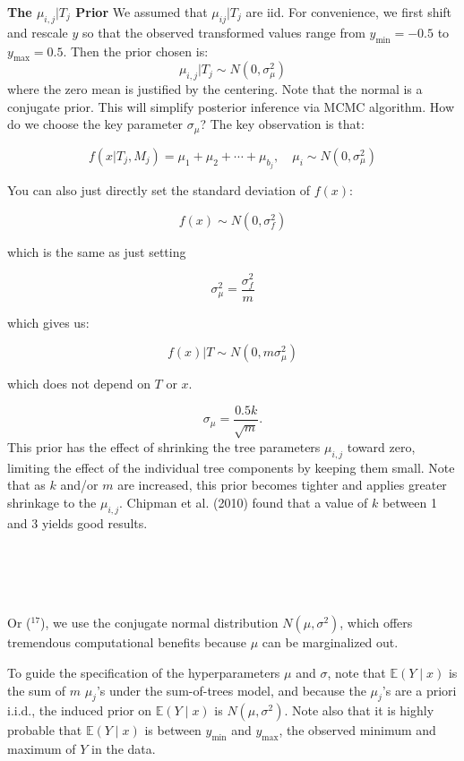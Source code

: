 \documentclass[a4paper,11pt]{article}
\begin{document}
\textbf{The \( \mu_{i,j} | T_j \) Prior}
We assumed that $\mu_{ij} | T_j$ are iid. For convenience, we first shift and rescale \( y \) so that the observed transformed values range from \( y_{\text{min}} = -0.5 \) to \( y_{\text{max}} = 0.5 \). Then the  prior chosen is:
\[
\mu_{i,j}| T_j \sim N(0, \sigma_\mu^2)
\]
where the zero mean is justified by the centering.  Note that the normal is a conjugate prior. This will simplify posterior inference via MCMC algorithm.
How do we choose the key parameter \( \sigma_\mu \)?
The key observation is that:

\[
f(x | T_j, M_j) = \mu_1 + \mu_2 + \cdots + \mu_{b_j}, \quad \mu_i \sim N(0, \sigma_\mu^2)
\]

You can also just directly set the standard deviation of \( f(x) \):

\[
f(x) \sim N(0, \sigma_f^2)
\]

which is the same as just setting

\[
\sigma_\mu^2 = \frac{\sigma_f^2}{m}
\]

which gives us:

\[
f(x) | T \sim N(0, m\sigma_\mu^2)
\]

which does not depend on \( T \) or \( x \).

\[
\sigma_\mu = \frac{0.5 k}{\sqrt{m}}.
\]
This prior has the effect of shrinking the tree parameters \( \mu_{i,j} \) toward zero, limiting the effect of the individual tree components by keeping them small. Note that as \( k \) and/or \( m \) are increased, this prior becomes tighter and applies greater shrinkage to the \( \mu_{i,j} \). Chipman et al. (2010) found that a value of \( k \) between 1 and 3 yields good results.

\\\\\\\\Or (\(^ {17}\)), we use the conjugate normal distribution \(N(\mu, \sigma^2)\), which offers tremendous computational benefits because \(\mu\) can be marginalized out. 

To guide the specification of the hyperparameters \(\mu\) and \(\sigma\), note that \(\mathbb{E}(Y \mid x)\) is the sum of \(m\) \(\mu_j\)'s under the sum-of-trees model, and because the \(\mu_j\)'s are a priori i.i.d., the induced prior on \(\mathbb{E}(Y \mid x)\) is \(N(\mu, \sigma^2)\). Note also that it is highly probable that \(\mathbb{E}(Y \mid x)\) is between \(y_{\text{min}}\) and \(y_{\text{max}}\), the observed minimum and maximum of \(Y\) in the data.
\end{document}
